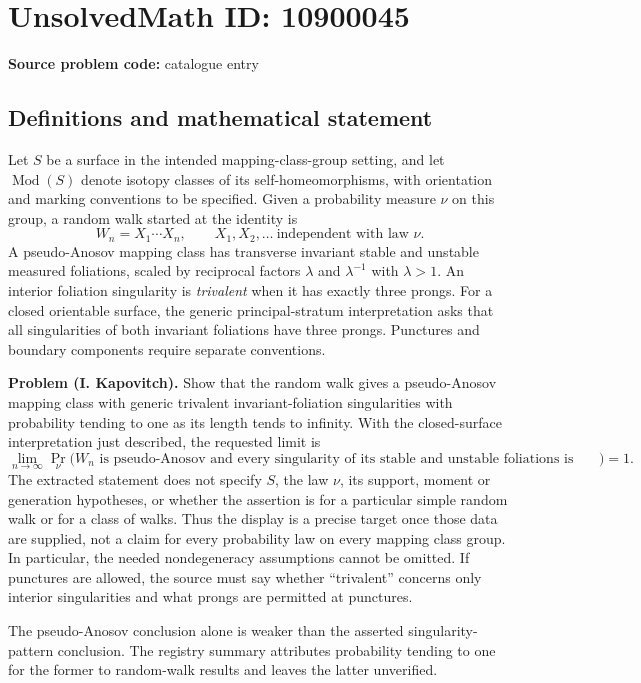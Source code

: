 \documentclass[11pt]{article}
\begin{document}
\section*{UnsolvedMath ID: 10900045}
\textbf{Source problem code:} catalogue entry
\subsection{Definitions and mathematical statement}
Let $S$ be a surface in the intended mapping-class-group setting, and let $\operatorname{Mod}(S)$ denote isotopy classes of its self-homeomorphisms, with orientation and marking conventions to be specified. Given a probability measure $\nu$ on this group, a random walk started at the identity is
\[
 W_n=X_1\cdots X_n,\qquad X_1,X_2,\ldots\ \text{independent with law }\nu.
\]
A pseudo-Anosov mapping class has transverse invariant stable and unstable measured foliations, scaled by reciprocal factors $\lambda$ and $\lambda^{-1}$ with $\lambda>1$. An interior foliation singularity is \emph{trivalent} when it has exactly three prongs. For a closed orientable surface, the generic principal-stratum interpretation asks that all singularities of both invariant foliations have three prongs. Punctures and boundary components require separate conventions.

\textbf{Problem (I. Kapovitch).} Show that the random walk gives a pseudo-Anosov mapping class with generic trivalent invariant-foliation singularities with probability tending to one as its length tends to infinity. With the closed-surface interpretation just described, the requested limit is
\[
 \lim_{n\to\infty}\Pr_\nu\bigl(W_n\text{ is pseudo-Anosov and every singularity of its stable and unstable foliations is three-pronged}\bigr)=1.
\]
The extracted statement does not specify $S$, the law $\nu$, its support, moment or generation hypotheses, or whether the assertion is for a particular simple random walk or for a class of walks. Thus the display is a precise target once those data are supplied, not a claim for every probability law on every mapping class group. In particular, the needed nondegeneracy assumptions cannot be omitted. If punctures are allowed, the source must say whether ``trivalent'' concerns only interior singularities and what prongs are permitted at punctures.

The pseudo-Anosov conclusion alone is weaker than the asserted singularity-pattern conclusion. The registry summary attributes probability tending to one for the former to random-walk results and leaves the latter unverified.
\end{document}

